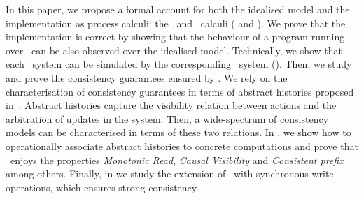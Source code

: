 In this paper, we propose a
formal account for both the idealised model and the  implementation as process calculi: the 
\gsp\ and \igsp\ calculi ( and ). We prove
that the implementation is correct by showing that the behaviour of a program
running over \igsp\ can be also observed over the idealised model. Technically, 
we show that each \igsp\ system can be simulated by the corresponding 
\gsp\  system (). Then, we study and prove the consistency guarantees ensured by 
\gsp.  
We rely on the characterisation of consistency guarantees in terms of abstract histories proposed in~\cite{DBLP:journals/ftpl/Burckhardt14}.
Abstract histories capture the visibility relation between actions and the arbitration of updates in the system. Then, 
a wide-spectrum of consistency models can be characterised in terms of these two relations. 
In , 
we show how to operationally associate abstract histories to concrete computations and 
prove that \gsp\ enjoys the properties  \textit{Monotonic Read},
 \textit{Causal Visibility}
and	{\em Consistent prefix} among others. Finally, in  we study the  
extension of \gsp\ with synchronous write operations, which ensures strong consistency. 


